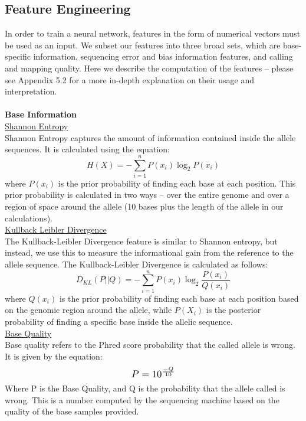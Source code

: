 \documentclass{article}
\begin{document}
\subsection{Feature Engineering}
In order to train a neural network, features in the form of numerical vectors must be used as an input. We subset our features into three broad sets, which are base-specific information, sequencing error and bias information features, and calling and mapping quality. Here we describe the computation of the features -- please see Appendix 5.2 for a more in-depth explanation on their usage and interpretation.\\\\
\textbf{Base Information} \\[0.3\baselineskip]
\underline{Shannon Entropy}\\
Shannon Entropy captures the amount of information contained inside the allele sequences. It is calculated using the equation:
\begin{equation}
H(X) = -\sum_{i=1}^{n}P(x_i)\log_{2}P(x_i)
\end{equation}
where $P(x_i)$ is the prior probability of finding each base at each position. This prior probability is calculated in two ways -- over the entire genome and over a region of space around the allele (10 bases plus the length of the allele in our calculations).\\[0.3\baselineskip]
\underline{Kullback Leibler Divergence}\\
The Kullback-Leibler Divergence feature is similar to Shannon entropy, but instead, we use this to measure the informational gain from the reference to the allele sequence. The Kullback-Leibler Divergence is calculated as follows:
\begin{equation}
D_{KL}(P||Q) = -\sum_{i=1}^{n}P(x_i)\log_{2}{\frac{P(x_i)}{Q(x_i)}}
\end{equation}
where $Q(x_i)$ is the prior probability of finding each base at each position based on the genomic region around the allele, while $P(X_i)$ is the posterior probability of finding a specific base inside the allelic sequence.\\[0.3\baselineskip]
\underline{Base Quality}\\
Base quality refers to the Phred score probability that the called allele is wrong. It is given by the equation:
\[ \scalebox{1.2}{$P=10^{\frac{-Q}{10}}$} \]
Where P is the Base Quality, and Q is the probability that the allele called is wrong. This is a number computed by the sequencing machine based on the quality of the base samples provided.\\\\
\end{document}
